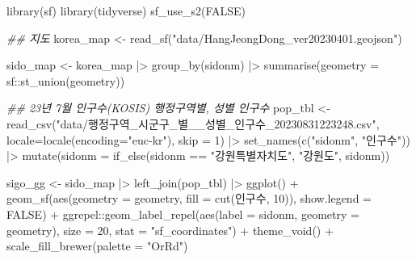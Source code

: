 \documentclass[
  letterpaper,
]{book}
\newenvironment{Shaded}{\begin{snugshade}}{\end{snugshade}}
\newcommand{\AttributeTok}[1]{\textcolor[rgb]{0.40,0.45,0.13}{#1}}
\newcommand{\ConstantTok}[1]{\textcolor[rgb]{0.56,0.35,0.01}{#1}}
\newcommand{\DecValTok}[1]{\textcolor[rgb]{0.68,0.00,0.00}{#1}}
\newcommand{\DocumentationTok}[1]{\textcolor[rgb]{0.37,0.37,0.37}{\textit{#1}}}
\newcommand{\FunctionTok}[1]{\textcolor[rgb]{0.28,0.35,0.67}{#1}}
\newcommand{\NormalTok}[1]{\textcolor[rgb]{0.00,0.23,0.31}{#1}}
\newcommand{\OtherTok}[1]{\textcolor[rgb]{0.00,0.23,0.31}{#1}}
\newcommand{\SpecialCharTok}[1]{\textcolor[rgb]{0.37,0.37,0.37}{#1}}
\newcommand{\StringTok}[1]{\textcolor[rgb]{0.13,0.47,0.30}{#1}}
\begin{document}
\begin{Shaded}
\begin{Highlighting}[]
\FunctionTok{library}\NormalTok{(sf)}
\FunctionTok{library}\NormalTok{(tidyverse)}
\FunctionTok{sf\_use\_s2}\NormalTok{(}\ConstantTok{FALSE}\NormalTok{)}

\DocumentationTok{\#\# 지도}
\NormalTok{korea\_map }\OtherTok{\textless{}{-}} \FunctionTok{read\_sf}\NormalTok{(}\StringTok{"data/HangJeongDong\_ver20230401.geojson"}\NormalTok{)}

\NormalTok{sido\_map }\OtherTok{\textless{}{-}}\NormalTok{ korea\_map }\SpecialCharTok{|\textgreater{}} 
  \FunctionTok{group\_by}\NormalTok{(sidonm) }\SpecialCharTok{|\textgreater{}} 
  \FunctionTok{summarise}\NormalTok{(}\AttributeTok{geometry =}\NormalTok{ sf}\SpecialCharTok{::}\FunctionTok{st\_union}\NormalTok{(geometry))}

\DocumentationTok{\#\# 23년 7월 인구수(KOSIS) 행정구역별, 성별 인구수}
\NormalTok{pop\_tbl }\OtherTok{\textless{}{-}} \FunctionTok{read\_csv}\NormalTok{(}\StringTok{"data/행정구역\_시군구\_별\_\_성별\_인구수\_20230831223248.csv"}\NormalTok{,}
         \AttributeTok{locale=}\FunctionTok{locale}\NormalTok{(}\AttributeTok{encoding=}\StringTok{"euc{-}kr"}\NormalTok{), }\AttributeTok{skip =} \DecValTok{1}\NormalTok{) }\SpecialCharTok{|\textgreater{}} 
  \FunctionTok{set\_names}\NormalTok{(}\FunctionTok{c}\NormalTok{(}\StringTok{"sidonm"}\NormalTok{, }\StringTok{"인구수"}\NormalTok{)) }\SpecialCharTok{|\textgreater{}} 
  \FunctionTok{mutate}\NormalTok{(}\AttributeTok{sidonm =} \FunctionTok{if\_else}\NormalTok{(sidonm }\SpecialCharTok{==} \StringTok{"강원특별자치도"}\NormalTok{, }\StringTok{"강원도"}\NormalTok{, sidonm))}

\NormalTok{sigo\_gg }\OtherTok{\textless{}{-}}\NormalTok{ sido\_map }\SpecialCharTok{|\textgreater{}} 
  \FunctionTok{left\_join}\NormalTok{(pop\_tbl) }\SpecialCharTok{|\textgreater{}} 
  \FunctionTok{ggplot}\NormalTok{() }\SpecialCharTok{+}
    \FunctionTok{geom\_sf}\NormalTok{(}\FunctionTok{aes}\NormalTok{(}\AttributeTok{geometry =}\NormalTok{ geometry, }\AttributeTok{fill =} \FunctionTok{cut}\NormalTok{(인구수, }\DecValTok{10}\NormalTok{)), }\AttributeTok{show.legend =} \ConstantTok{FALSE}\NormalTok{) }\SpecialCharTok{+}
\NormalTok{    ggrepel}\SpecialCharTok{::}\FunctionTok{geom\_label\_repel}\NormalTok{(}\FunctionTok{aes}\NormalTok{(}\AttributeTok{label =}\NormalTok{ sidonm, }\AttributeTok{geometry =}\NormalTok{ geometry), }
                              \AttributeTok{size =} \DecValTok{20}\NormalTok{, }\AttributeTok{stat =} \StringTok{"sf\_coordinates"}\NormalTok{) }\SpecialCharTok{+}
    \FunctionTok{theme\_void}\NormalTok{() }\SpecialCharTok{+}
    \FunctionTok{scale\_fill\_brewer}\NormalTok{(}\AttributeTok{palette =} \StringTok{"OrRd"}\NormalTok{)}


\end{Highlighting}
\end{Shaded}
\end{document}

